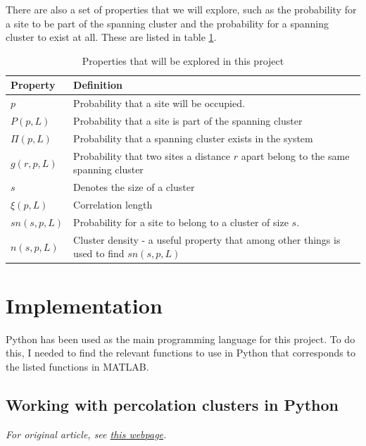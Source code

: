 \documentclass[a4paper,reprint,floatfix,amsmath,amssymb,aps,pra]{revtex4-1}
\begin{document}
There are also a set of properties that we will explore, such as the probability for a site to be part of the spanning cluster and the probability for a spanning cluster to exist at all. These are listed in table \ref{tab:properties}.
\begingroup
\begin{table}[ht]
\begin{ruledtabular}
\begin{tabular}{l p{}}
Property       &                  Definition \\
\hline
$p$             &       Probability that a site will be occupied. \\
$P(p, L)$       &       Probability that a site is part of the spanning cluster \\
$\Pi(p,L)$      &       Probability that a spanning cluster exists in the system \\
$g(r,p,L)$      &       Probability that two sites a distance $r$ apart belong to the same spanning cluster \\
$s$             &       Denotes the size of a cluster \\
$\xi(p,L)$      &       Correlation length \\
$sn(s,p,L)$     &       Probability for a site to belong to a cluster of size $s$. \\
$n(s,p,L)$      &       Cluster density - a useful property that among other things is used to find $sn(s,p,L)$ \\
\end{tabular}
\end{ruledtabular}
\caption{Properties that will be explored in this project}
\label{tab:properties}
\end{table}
\endgroup

\section{Implementation}

Python has been used as the main programming language for this project. To do this, I needed to find the relevant functions to use in Python that corresponds to the listed functions in MATLAB.

\subsection{Working with percolation clusters in Python}

\emph{For original article, see \href{http://dragly.org/2013/03/25/working-with-percolation-clusters-in-python/}{this webpage}.}
\end{document}
